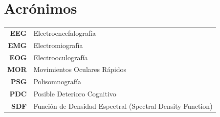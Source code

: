 \documentclass[12pt,a4paper]{mitthesis}
\begin{document}


\chapter*{Acr\'onimos}

\begin{tabular}{rl}
\textbf{EEG} & Electroencefalograf\'ia %
\\
\textbf{EMG} & Electromiograf\'ia %
\\
\textbf{EOG} & Electrooculograf\'ia %
\\
\textbf{MOR} & Movimientos Oculares R\'apidos
\\
\textbf{PSG} & Polisomnograf\'ia %
\\
\textbf{PDC} & Posible Deterioro Cognitivo
\\
\textbf{SDF} & Funci\'on de Densidad Espectral (Spectral Density Function)
\end{tabular}

\newpage


\thispagestyle{empty}

\tableofcontents
\newpage

\end{document}
